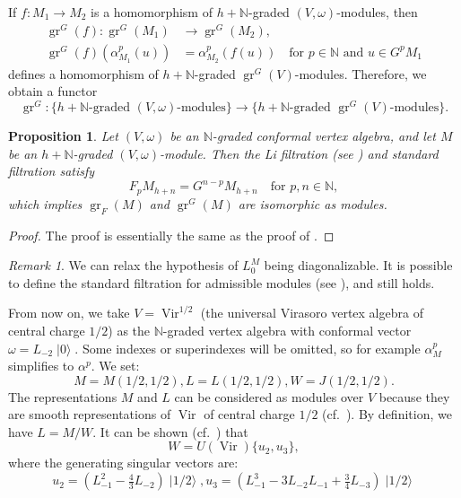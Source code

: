 \documentclass[a4paper, 12pt, reqno]{amsart}
\newtheorem{proposition}[theorem]{Proposition}
\theoremstyle{remark}
\newtheorem{remark}[theorem]{Remark}
\DeclareMathOperator{\Vir}{Vir}
\DeclareMathOperator{\gr}{gr}
\DeclareMathOperator{\vac}{|0\rangle}
\DeclareMathOperator{\vachalf}{|1/2\rangle}
\begin{document}
If $f: M_1 \to M_2$ is a homomorphism of $h + \mathbb{N}$-graded $(V, \omega)$-modules, then
\begin{align*}
  \gr^G(f): \gr^G(M_1) &\to \gr^G(M_2), \\
  \gr^G(f)(\alpha^p_{M_1}(u)) &= \alpha^p_{M_2}(f(u)) \quad \text{for $p \in \mathbb{N}$ and $u \in G^pM_1$}
\end{align*}
defines a homomorphism of $h + \mathbb{N}$-graded $\gr^G(V)$-modules.
Therefore, we obtain a functor
\begin{equation*}
  \gr^G: \{\text{$h + \mathbb{N}$-graded $(V, \omega)$-modules}\} \to \{\text{$h + \mathbb{N}$-graded $\gr^G(V)$-modules}\}.
\end{equation*}

\begin{proposition}
  \label{prp:3}
  Let $(V, \omega)$ be an $\mathbb{N}$-graded conformal vertex algebra, and let $M$ be an $h + \mathbb{N}$-graded $(V, \omega)$-module.
  Then the Li filtration (see \cite{li_abelianizing_2005}) and standard filtration satisfy
  \begin{equation*}
    F_pM_{h + n} = G^{n - p}M_{h + n} \quad \text{for $p, n \in \mathbb{N}$},
  \end{equation*}
  which implies $\gr_F(M)$ and $\gr^G(M)$ are isomorphic as modules.
\end{proposition}

\begin{proof}
  The proof is essentially the same as the proof of \cite[Proposition 2.6.1]{arakawa_remark_2012}.
\end{proof}

\begin{remark}
  \label{rmk:2}
  We can relax the hypothesis of $L_0^M$ being diagonalizable.
  It is possible to define the standard filtration for admissible modules (see \cite[Definition 3.3]{dong_twisted_1998}), and  still holds.
\end{remark}

From now on, we take $V = \Vir^{1/2}$ (the universal Virasoro vertex algebra of central charge $1/2$) as the $\mathbb{N}$-graded vertex algebra with conformal vector $\omega = L_{-2}\vac$.
Some indexes or superindexes will be omitted, so for example $\alpha^p_M$ simplifies to $\alpha^p$.
We set:
\begin{equation*}
  M = M(1/2, 1/2), L = L(1/2, 1/2), W = J(1/2, 1/2).
\end{equation*}
The representations $M$ and $L$ can be considered as modules over $V$ because they are smooth representations of $\Vir$ of central charge $1/2$ (cf.\ \cite[Theorem 6.1.7]{lepowsky_introduction_2004}).
By definition, we have $L = M/W$.
It can be shown (cf.\ \cite{astashkevich_structure_1997}) that
\begin{equation}
  \label{eq:3}
  W = U(\Vir)\{u_2, u_3\},
\end{equation}
where the generating singular vectors are:
\begin{equation*}
  u_2 = (L_{-1}^2 - \tfrac{4}{3}L_{-2})\vachalf, u_3 = (L_{-1}^3 - 3L_{-2}L_{-1} + \tfrac{3}{4}L_{-3})\vachalf
\end{equation*}
\end{document}
